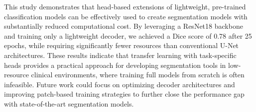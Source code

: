 \documentclass[conference]{IEEEtran}
\begin{document}
This study demonstrates that head-based extensions of lightweight, pre-trained classification models can be effectively used to create segmentation models with substantially reduced computational cost. By leveraging a ResNet18 backbone and training only a lightweight decoder, we achieved a Dice score of 0.78 after 25 epochs, while requiring significantly fewer resources than conventional U-Net architectures. These results indicate that transfer learning with task-specific heads provides a practical approach for developing segmentation tools in low-resource clinical environments, where training full models from scratch is often infeasible. Future work could focus on optimizing decoder architectures and improving patch-based training strategies to further close the performance gap with state-of-the-art segmentation models.

 

\end{document}
